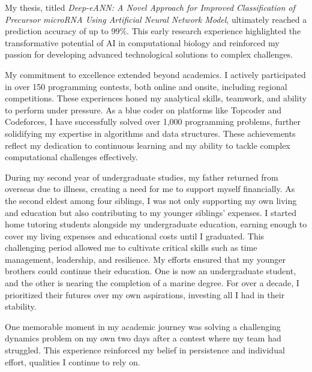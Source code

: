 \documentclass[11pt]{article}
\newif\ifshowsections
\begin{document}
My thesis, titled \textit{Deep-eANN: A Novel Approach for Improved Classification of Precursor microRNA Using
Artificial Neural Network Model}, ultimately reached a prediction accuracy of up to 99\%. This early research
experience highlighted the transformative potential of AI in computational biology and reinforced my passion for
developing advanced technological solutions to complex challenges.

\ifshowsections\section*{Programming Contest Experience}\fi

My commitment to excellence extended beyond academics. I actively participated in over 150 programming
contests, both online and onsite, including regional competitions. These experiences honed my analytical
skills, teamwork, and ability to perform under pressure. As a blue coder on platforms like Topcoder and
Codeforces, I have successfully solved over 1,000 programming problems, further solidifying my expertise
in algorithms and data structures. These achievements reflect my dedication to continuous
learning and my ability to tackle complex computational challenges effectively.

\ifshowsections\section*{Personal Resilience and Sacrifices}\fi

During my second year of undergraduate studies, my father returned from overseas due to illness,
creating a need for me to support myself financially. As the second eldest among four siblings, I was
not only supporting my own living and education but also contributing to my younger siblings' expenses.
I started home tutoring students alongside my undergraduate education, earning enough to cover my
living expenses and educational costs until I graduated. This challenging period allowed me to cultivate
critical skills such as time management, leadership, and resilience. My efforts ensured that my younger
brothers could continue their education. One is now an undergraduate student, and the other is nearing the
completion of a marine degree. For over a decade, I prioritized their futures over my own aspirations,
investing all I had in their stability.

One memorable moment in my academic journey was solving a challenging dynamics problem on my own two days
after a contest where my team had struggled. This experience reinforced my belief in persistence and
individual effort, qualities I continue to rely on.
\end{document}
